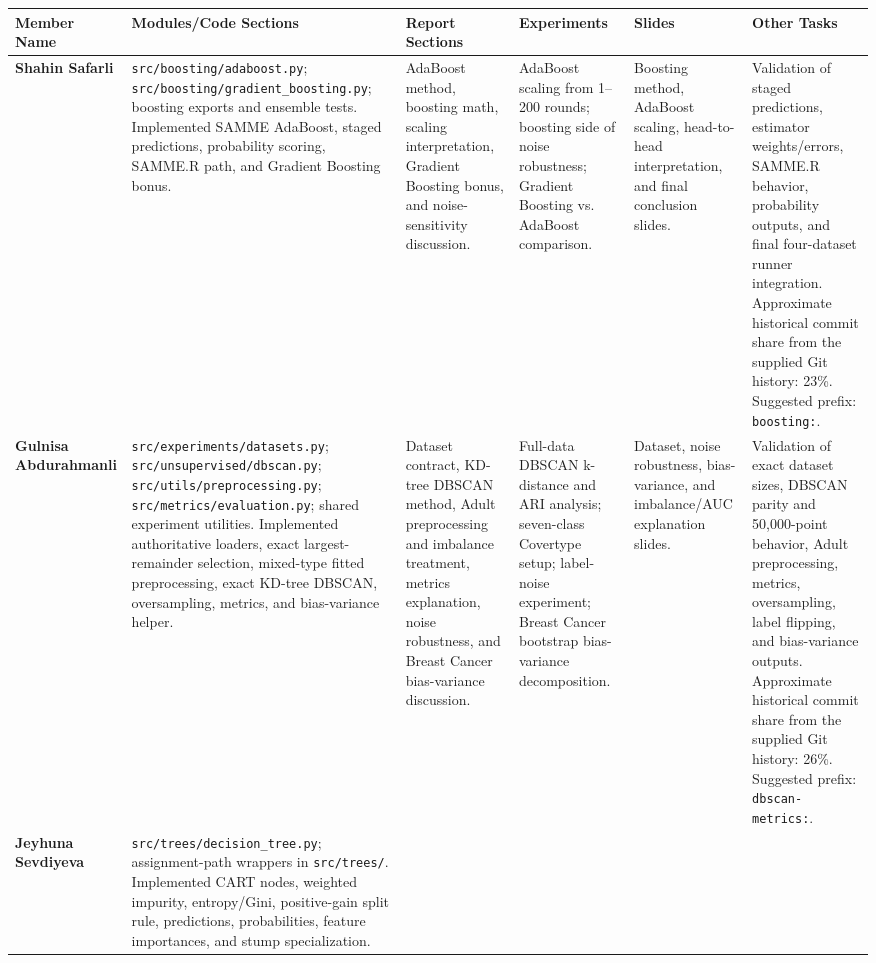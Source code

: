 \documentclass[10pt,a4paper,landscape]{article}
\begin{document}
\begin{table}[h]
\centering
\scriptsize
\begin{tabularx}{\textwidth}{@{}p{2.55cm}YYYYY@{}}
\toprule
\textbf{Member Name} & \textbf{Modules/Code Sections} & \textbf{Report Sections} & \textbf{Experiments} & \textbf{Slides} & \textbf{Other Tasks} \\
\midrule
\textbf{Shahin Safarli}
&
\texttt{src/boosting/adaboost.py}; \texttt{src/boosting/gradient\_boosting.py}; boosting exports and ensemble tests. Implemented SAMME AdaBoost, staged predictions, probability scoring, SAMME.R path, and Gradient Boosting bonus.
&
AdaBoost method, boosting math, scaling interpretation, Gradient Boosting bonus, and noise-sensitivity discussion.
&
AdaBoost scaling from 1--200 rounds; boosting side of noise robustness; Gradient Boosting vs. AdaBoost comparison.
&
Boosting method, AdaBoost scaling, head-to-head interpretation, and final conclusion slides.
&
Validation of staged predictions, estimator weights/errors, SAMME.R behavior, probability outputs, and final four-dataset runner integration. Approximate historical commit share from the supplied Git history: 23\%. Suggested prefix: \texttt{boosting:}.
\\
\midrule
\textbf{Gulnisa Abdurahmanli}
&
\texttt{src/experiments/datasets.py}; \texttt{src/unsupervised/dbscan.py}; \texttt{src/utils/preprocessing.py}; \texttt{src/metrics/evaluation.py}; shared experiment utilities. Implemented authoritative loaders, exact largest-remainder selection, mixed-type fitted preprocessing, exact KD-tree DBSCAN, oversampling, metrics, and bias-variance helper.
&
Dataset contract, KD-tree DBSCAN method, Adult preprocessing and imbalance treatment, metrics explanation, noise robustness, and Breast Cancer bias-variance discussion.
&
Full-data DBSCAN k-distance and ARI analysis; seven-class Covertype setup; label-noise experiment; Breast Cancer bootstrap bias-variance decomposition.
&
Dataset, noise robustness, bias-variance, and imbalance/AUC explanation slides.
&
Validation of exact dataset sizes, DBSCAN parity and 50,000-point behavior, Adult preprocessing, metrics, oversampling, label flipping, and bias-variance outputs. Approximate historical commit share from the supplied Git history: 26\%. Suggested prefix: \texttt{dbscan-metrics:}.
\\
\midrule
\textbf{Jeyhuna Sevdiyeva}
&
\texttt{src/trees/decision\_tree.py}; assignment-path wrappers in \texttt{src/trees/}. Implemented CART nodes, weighted impurity, entropy/Gini, positive-gain split rule, predictions, probabilities, feature importances, and stump specialization.

\end{tabularx}
\end{table}
\end{document}
